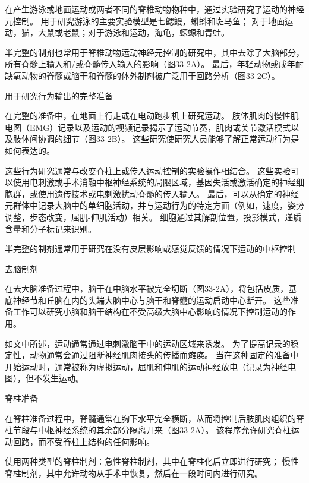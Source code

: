 \begin{proposition}[用于研究运动神经元控制的制剂] \label{box:33_1}
	
	\quad \quad 在产生游泳或地面运动或两者不同的脊椎动物物种中，通过实验研究了运动的神经元控制。
	用于研究游泳的主要实验模型是七鳃鳗，蝌蚪和斑马鱼；
	对于地面运动，猫，大鼠或老鼠；对于游泳和运动，海龟，蝾螈和青蛙。
	
	\quad \quad 半完整的制剂也常用于脊椎动物运动神经元控制的研究中，其中去除了大脑部分，所有脊髓上输入和/或脊髓传入输入的影响（图33-2A）。
	最后，年轻动物或成年耐缺氧动物的脊髓或脑干和脊髓的体外制剂被广泛用于回路分析（图33-2C）。
	
	\quad \quad 用于研究行为输出的完整准备
	
	\quad \quad 在完整的准备中，在地面上行走或在电动跑步机上研究运动。
	肢体肌肉的慢性肌电图（EMG）记录以及运动的视频记录揭示了运动节奏，肌肉或关节激活模式以及肢体间协调的细节（图33-2B）。
	这些研究使研究人员能够了解正常运动行为是如何表达的。
	
	\quad \quad 这些行为研究通常与改变脊柱上或传入运动控制的实验操作相结合。
	这些实验可以使用电刺激或手术消融中枢神经系统的局限区域，基因失活或激活确定的神经细胞群，或使用遗传技术或电刺激扰动脊髓的传入输入。
	最后，可以从确定的神经元群体中记录大脑中的单细胞活动，并与运动行为的特定方面（例如，速度，姿势调整，步态改变，屈肌-伸肌活动）相关。
	细胞通过其解剖位置，投影模式，递质含量和分子标记来识别。
	
	\quad \quad 半完整的制剂通常用于研究在没有皮层影响或感觉反馈的情况下运动的中枢控制
	
	\quad \quad 去脑制剂
	
	\quad \quad 在去大脑准备过程中，脑干在中脑水平被完全切断（图33-2A），将包括皮质，基底神经节和丘脑在内的头端大脑中心与脑干和脊髓的运动启动中心断开。
	这些准备工作可以研究小脑和脑干结构在不受高级大脑中心影响的情况下控制运动的作用。
	
	\quad \quad 如文中所述，运动通常通过电刺激脑干中的运动区域来诱发。
	为了提高记录的稳定性，动物通常会通过阻断神经肌肉接头的传播而瘫痪。
	当在这种固定的准备中开始运动时，通常被称为虚拟运动，屈肌和伸肌的运动神经放电（记录为神经电图），但不发生运动。
	
	\quad \quad 脊柱准备
	
	\quad \quad 在脊柱准备过程中，脊髓通常在胸下水平完全横断，从而将控制后肢肌肉组织的脊柱节段与中枢神经系统的其余部分隔离开来（图33-2A）。
	该程序允许研究脊柱运动回路，而不受脊柱上结构的任何影响。
	
	\quad \quad 使用两种类型的脊柱制剂：急性脊柱制剂，其中在脊柱化后立即进行研究；
	慢性脊柱制剂，其中允许动物从手术中恢复，然后在一段时间内进行研究。
	

\end{proposition}
